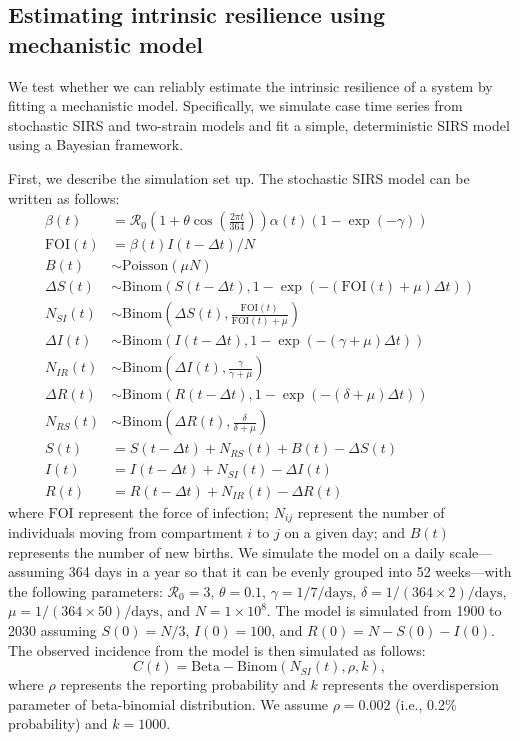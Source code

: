\documentclass[12pt]{article}
\begin{document}
\subsection*{Estimating intrinsic resilience using mechanistic model}

We test whether we can reliably estimate the intrinsic resilience of a system by fitting a mechanistic model.
Specifically, we simulate case time series from stochastic SIRS and two-strain models and fit a simple, deterministic SIRS model using a Bayesian framework.

First, we describe the simulation set up.
The stochastic SIRS model can be written as follows:
\begin{align}
\beta(t) &= \mathcal R_0 \left(1 + \theta \cos\left(\frac{2 \pi t}{364}\right)\right) \alpha(t)  (1-\exp(-\gamma))\\
\textrm{FOI}(t) &= \beta(t) I(t- \Delta t)/N\\
B(t) &\sim \mathrm{Poisson}(\mu N)\\
\Delta S(t) &\sim \mathrm{Binom}\left(S(t-\Delta t), 1- \exp(-(\textrm{FOI}(t) + \mu) \Delta t )\right) \\
N_{SI}(t) &\sim \mathrm{Binom}\left(\Delta S(t), \frac{\textrm{FOI}(t)}{\textrm{FOI}(t) + \mu} \right)\\
\Delta I(t) &\sim \mathrm{Binom}\left(I(t-\Delta t), 1- \exp(-(\gamma + \mu) \Delta t )\right) \\
N_{IR}(t) &\sim \mathrm{Binom}\left(\Delta I(t), \frac{\gamma}{\gamma + \mu} \right)\\
\Delta R(t) &\sim \mathrm{Binom}\left(R(t-\Delta t), 1- \exp(-(\delta+ \mu) \Delta t )\right) \\
N_{RS}(t) &\sim \mathrm{Binom}\left(\Delta R(t), \frac{\delta}{\delta + \mu} \right)\\
S(t) &= S(t-\Delta t) + N_{RS}(t) + B(t) - \Delta S(t)\\
I(t) &= I(t-\Delta t) + N_{SI}(t) - \Delta I(t)\\
R(t) &= R(t-\Delta t) + N_{IR}(t) - \Delta R(t)
\end{align}
where $\textrm{FOI}$ represent the force of infection;
$N_{ij}$ represent the number of individuals moving from compartment $i$ to $j$ on a given day; 
and $B(t)$ represents the number of new births.
We simulate the model on a daily scale---assuming 364 days in a year so that it can be evenly grouped into 52 weeks---with the following parameters:
$\mathcal R_0 = 3$, $\theta = 0.1$, $\gamma = 1/7/\mathrm{days}$, $\delta = 1/(364\times 2)/\mathrm{days}$,
$\mu =1/(364\times 50)/\mathrm{days}$, and $N = 1 \times 10^{8}$.
The model is simulated from 1900 to 2030 assuming $S(0) = N/3$, $I(0) = 100$, and $R(0) = N - S(0) - I(0)$.
The observed incidence from the model is then simulated as follows:
\begin{equation}
C(t) = \mathrm{Beta-Binom}(N_{SI}(t), \rho, k), 
\end{equation}
where $\rho$ represents the reporting probability and $k$ represents the overdispersion parameter of beta-binomial distribution.
We assume $\rho = 0.002$ (i.e., 0.2\% probability) and $k = 1000$.
\end{document}
